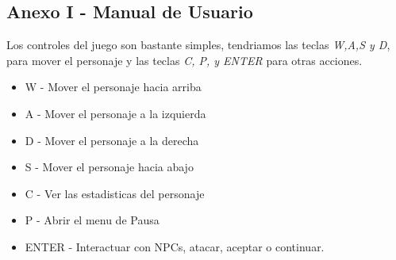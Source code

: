 \documentclass[a4paper]{article}
\begin{document}
\begin{appendices}
    \renewcommand{\thesection}{} %

    \section{Anexo I - Manual de Usuario}
    Los controles del juego son bastante simples, tendriamos las teclas \textit{W,A,S y D}, para mover el personaje y las teclas \textit{C, P, y ENTER} para otras acciones.
    \begin{itemize}
        \item W - Mover el personaje hacia arriba
        \item A - Mover el personaje a la izquierda
        \item D - Mover el personaje a la derecha
        \item S - Mover el personaje hacia abajo
        \item C - Ver las estadisticas del personaje
        \item P - Abrir el menu de Pausa
        \item ENTER - Interactuar con NPCs, atacar, aceptar o continuar.
    \end{itemize}
    \clearpage


\end{appendices}
\end{document}
